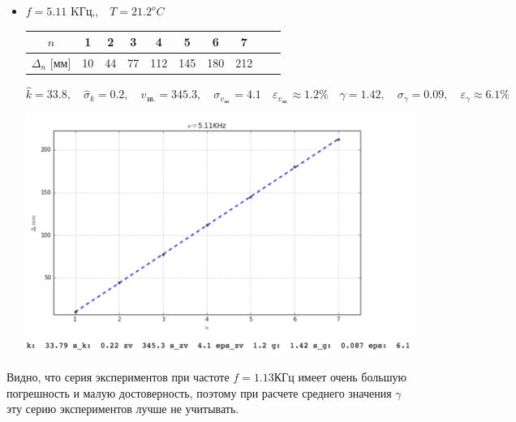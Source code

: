 \documentclass[10pt]{article}
\begin{document}
\begin{enumerate}
\begin{itemize}
        \item $f = 5.11$ KГц,,$ \quad T = 21.2^o C$

        \begin{center}
                    \begin{tabular}{|c|c|c|c|c|c|c|c|c|c|}
                            \hline 
                                $n$ & 1 & 2 & 3 & 4 & 5 & 6 & 7 \\
                            \hline
                                $\Delta_n$ [мм]& 10&44&77&112&145&180&212\\
                            \hline
                    \end{tabular}
        \end{center}

        \begin{equation}
            \hat{k} = 33.8 ,\quad \hat{\sigma}_k = 0.2, \quad v_\text{зв.} = 345.3, \quad \sigma_{v_\text{зв.}} = 4.1 \quad \varepsilon_{v_\text{зв.}} \approx 1.2\% \quad \gamma = 1.42, \quad \sigma_\gamma = 0.09, \quad \varepsilon_\gamma \approx 6.1\%
        \end{equation}

        \begin{center} 
            \includegraphics[width=5in]{5ex.png}
        \end{center}

    \end{itemize}

    \end{enumerate}

    Видно, что серия экспериментов при частоте $f = 1.13\text{КГц}$ имеет очень большую погрешность и малую достоверность, поэтому при расчете среднего значения $\gamma$ эту серию экспериментов лучше не учитывать.
\end{document}
